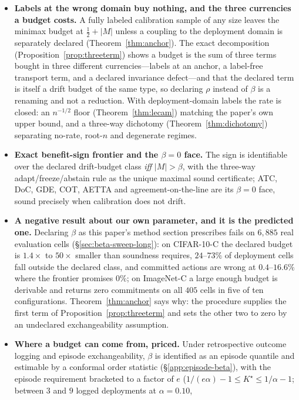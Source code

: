 \documentclass[conference]{IEEEtran}
\theoremstyle{plain}
\theoremstyle{definition}
\begin{document}
\begin{itemize}
size, every calibration sample size and every evidence map (Theorem~\ref{thm:beta-minimax}(d)).
\item \textbf{Labels at the wrong domain buy nothing, and the three currencies a budget costs.} A
fully labeled calibration sample of any size leaves the minimax budget at $\tfrac12+|M|$ unless a
coupling to the deployment domain is separately declared (Theorem~\ref{thm:anchor}). The exact
decomposition (Proposition~\ref{prop:threeterm}) shows a budget is the sum of three terms bought in
three different currencies---labels at an anchor, a label-free transport term, and a declared
invariance defect---and that the declared term is itself a drift budget of the same type, so
declaring $\rho$ instead of $\beta$ is a renaming and not a reduction. With deployment-domain labels
the rate is closed: an $n^{-1/2}$ floor (Theorem~\ref{thm:lecam}) matching the paper's own upper
bound, and a three-way dichotomy (Theorem~\ref{thm:dichotomy}) separating no-rate, root-$n$ and
degenerate regimes.
\item \textbf{Exact benefit-sign frontier and the $\beta{=}0$ face.} The sign is identifiable over
the declared drift-budget class \emph{iff} $|M|>\beta$, with the three-way adapt/freeze/abstain rule
as the unique maximal sound certificate; ATC, DoC, GDE, COT, AETTA and agreement-on-the-line are its
$\beta{=}0$ face, sound precisely when calibration does not drift.
\item \textbf{A negative result about our own parameter, and it is the predicted one.} Declaring
$\beta$ as this paper's method section prescribes fails on $6{,}885$ real evaluation cells
(\S\ref{sec:beta-sweep-long}): on CIFAR-10-C the declared budget is $1.4\times$ to $50\times$
smaller than soundness requires, $24$--$73\%$ of deployment cells fall outside the declared class,
and committed actions are wrong at $0.4$--$16.6\%$ where the frontier promises $0\%$; on ImageNet-C
a large enough budget is derivable and returns zero commitments on all $405$ cells in five of ten
configurations. Theorem~\ref{thm:anchor} says why: the procedure supplies the first term of
Proposition~\ref{prop:threeterm} and sets the other two to zero by an undeclared exchangeability
assumption.
\item \textbf{Where a budget can come from, priced.} Under retrospective outcome logging and episode
exchangeability, $\beta$ is identified as an episode quantile and estimable by a conformal order
statistic (\S\ref{app:episode-beta}), with the episode requirement bracketed to a factor of $e$
($1/(e\alpha)-1\le K^\star\le1/\alpha-1$; between $3$ and $9$ logged deployments at $\alpha=0.10$,

\end{itemize}
\end{document}
